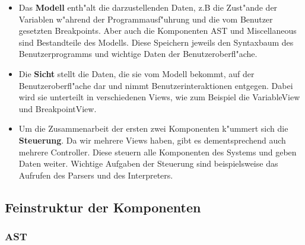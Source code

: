 \documentclass[10pt,a4paper,titlepage]{article}
\begin{document}
\begin{itemize}
\item Das \textbf{Modell} enth"alt die darzustellenden Daten, z.B die Zust"ande der Variablen w"ahrend der Programmausf"uhrung und die vom Benutzer gesetzten Breakpoints. Aber auch die Komponenten AST und Miscellaneous sind Bestandteile des Modells. Diese Speichern jeweils den Syntaxbaum des Benutzerprogramms und wichtige Daten der Benutzeroberfl"ache. 
\item Die \textbf{Sicht} stellt die Daten, die sie vom Modell bekommt, auf der Benutzeroberfl"ache dar und nimmt Benutzerinteraktionen entgegen. Dabei wird sie unterteilt in verschiedenen Views, wie zum Beispiel die VariableView und BreakpointView. 
\item Um die Zusammenarbeit der ersten zwei Komponenten k"ummert sich die \textbf{Steuerung}. Da wir mehrere Views haben, gibt es dementsprechend auch mehrere Controller. Diese steuern alle Komponenten des Systems und geben Daten weiter. Wichtige Aufgaben der Steuerung sind beispielsweise das Aufrufen des Parsers und des Interpreters. \\
\end{itemize}

\subsection{Feinstruktur der Komponenten}

\subsubsection{AST}
\end{document}
